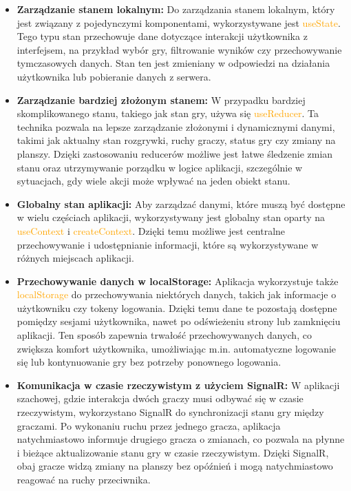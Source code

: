 \documentclass[12pt,a4paper]{article}
\begin{document}
\begin{itemize}
    \item \textbf{Zarządzanie stanem lokalnym:} Do zarządzania stanem lokalnym, który jest związany z pojedynczymi komponentami, wykorzystywane jest \textcolor{orange}{useState}. Tego typu stan przechowuje dane dotyczące interakcji użytkownika z interfejsem, na przykład wybór gry, filtrowanie wyników czy przechowywanie tymczasowych danych. Stan ten jest zmieniany w odpowiedzi na działania użytkownika lub pobieranie danych z serwera.
    \item \textbf{Zarządzanie bardziej złożonym stanem:} W przypadku bardziej skomplikowanego stanu, takiego jak stan gry, używa się \textcolor{orange}{useReducer}. Ta technika pozwala na lepsze zarządzanie złożonymi i dynamicznymi danymi, takimi jak aktualny stan rozgrywki, ruchy graczy, status gry czy zmiany na planszy. Dzięki zastosowaniu reducerów możliwe jest łatwe śledzenie zmian stanu oraz utrzymywanie porządku w logice aplikacji, szczególnie w sytuacjach, gdy wiele akcji może wpływać na jeden obiekt stanu.
    \item \textbf{Globalny stan aplikacji:} Aby zarządzać danymi, które muszą być dostępne w wielu częściach aplikacji, wykorzystywany jest globalny stan oparty na \textcolor{orange}{useContext} i \textcolor{orange}{createContext}. Dzięki temu możliwe jest centralne przechowywanie i udostępnianie informacji, które są wykorzystywane w różnych miejscach aplikacji.
    \item \textbf{Przechowywanie danych w localStorage:} Aplikacja wykorzystuje także \textcolor{orange}{localStorage} do przechowywania niektórych danych, takich jak informacje o użytkowniku czy tokeny logowania. Dzięki temu dane te pozostają dostępne pomiędzy sesjami użytkownika, nawet po odświeżeniu strony lub zamknięciu aplikacji. Ten sposób zapewnia trwałość przechowywanych danych, co zwiększa komfort użytkownika, umożliwiając m.in. automatyczne logowanie się lub kontynuowanie gry bez potrzeby ponownego logowania.
    \item \textbf{Komunikacja w czasie rzeczywistym z użyciem SignalR:}
    W aplikacji szachowej, gdzie interakcja dwóch graczy musi odbywać się w czasie rzeczywistym, wykorzystano SignalR do synchronizacji stanu gry między graczami. Po wykonaniu ruchu przez jednego gracza, aplikacja natychmiastowo informuje drugiego gracza o zmianach, co pozwala na płynne i bieżące aktualizowanie stanu gry w czasie rzeczywistym. Dzięki SignalR, obaj gracze widzą zmiany na planszy bez opóźnień i mogą natychmiastowo reagować na ruchy przeciwnika.
\end{itemize}
\end{document}
